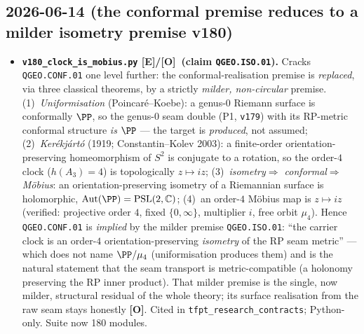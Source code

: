 \documentclass[11pt]{article}
\providecommand{\mE}{\textbf{[E]}}\providecommand{\mC}{\textbf{[C]}}
\providecommand{\mO}{\textbf{[O]}}\providecommand{\mX}{\textbf{[X]}}
\providecommand{\vref}[1]{\texttt{#1}}
\begin{document}
\subsection*{2026-06-14 (the conformal premise reduces to a milder isometry premise v180)}
\begin{itemize}
\item \textbf{\texttt{v180\_clock\_is\_mobius.py} \mE/\mO\ (claim \texttt{QGEO.ISO.01}).} Cracks
  \texttt{QGEO.CONF.01} one level further: the conformal-realisation premise is \emph{replaced}, via
  three classical theorems, by a strictly \emph{milder, non-circular} premise. (1)~\emph{Uniformisation}
  (Poincar\'e--Koebe): a genus-$0$ Riemann surface is conformally $\PP$, so the genus-$0$ seam double
  (P1, \vref{v179}) with its RP-metric conformal structure \emph{is} $\PP$ --- the target is
  \emph{produced}, not assumed; (2)~\emph{Ker\'ekj\'art\'o} (1919; Constantin--Kolev 2003): a
  finite-order orientation-preserving homeomorphism of $S^2$ is conjugate to a rotation, so the
  order-$4$ clock ($h(A_3){=}4$) is topologically $z\mapsto iz$; (3)~\emph{isometry$\Rightarrow$
  conformal$\Rightarrow$M\"obius}: an orientation-preserving isometry of a Riemannian surface is
  holomorphic, $\mathrm{Aut}(\PP)=\mathrm{PSL}(2,\mathbb C)$; (4)~an order-$4$ M\"obius map is
  $z\mapsto iz$ (verified: projective order $4$, fixed $\{0,\infty\}$, multiplier $i$, free orbit
  $\mu_4$). Hence \texttt{QGEO.CONF.01} is \emph{implied} by the milder premise \texttt{QGEO.ISO.01}:
  ``the carrier clock is an order-$4$ orientation-preserving \emph{isometry} of the RP seam metric'' ---
  which does not name $\PP/\mu_4$ (uniformisation produces them) and is the natural statement that the
  seam transport is metric-compatible (a holonomy preserving the RP inner product). That milder premise
  is the single, now milder, structural residual of the whole theory; its surface realisation from the
  raw seam stays honestly \mO. Cited in \texttt{tfpt\_research\_contracts}; Python-only. Suite now 180
  modules.
\end{itemize}
\end{document}
